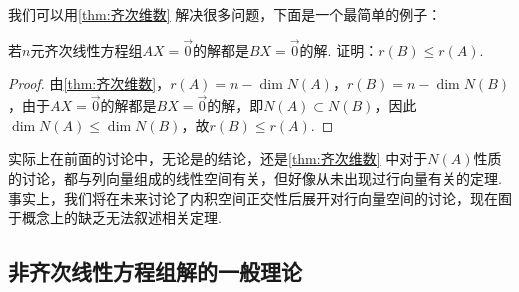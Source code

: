 我们可以用\autoref{thm:齐次维数} 解决很多问题，下面是一个最简单的例子：
\begin{example}{}{}
    若$n$元齐次线性方程组$AX = \vec{0}$的解都是$BX = \vec{0}$的解. 证明：$r(B) \leqslant r(A)$.
\end{example}

\begin{proof}
    由\autoref{thm:齐次维数}，$r(A)=n-\dim N(A)$，$r(B)=n-\dim N(B)$，由于$AX=\vec{0}$的解都是$BX=\vec{0}$的解，即$N(A) \subset N(B)$，因此$\dim N(A) \leqslant \dim N(B)$，故$r(B) \leqslant r(A)$.
\end{proof}


实际上在前面的讨论中，无论是的结论，还是\autoref{thm:齐次维数} 中对于$N(A)$性质的讨论，都与列向量组成的线性空间有关，但好像从未出现过行向量有关的定理. 事实上，我们将在未来讨论了内积空间正交性后展开对行向量空间的讨论，现在囿于概念上的缺乏无法叙述相关定理.

\subsection{非齐次线性方程组解的一般理论}

